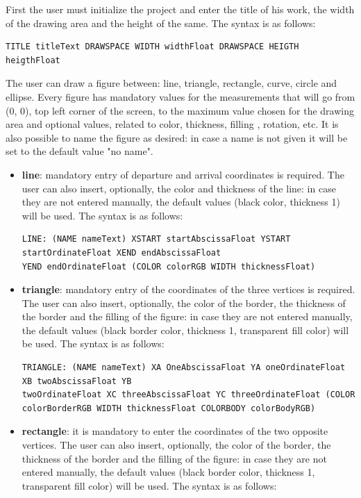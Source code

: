 \documentclass[a4paper]{article}
\begin{document}
First the user must initialize the project and enter the title of his work, the width of the drawing area and the height of the same. The syntax is as follows:
\begin{verbatim}
TITLE titleText DRAWSPACE WIDTH widthFloat DRAWSPACE HEIGTH heigthFloat
\end{verbatim}
The user can draw a figure between: line, triangle, rectangle, curve, circle and ellipse. Every figure has mandatory values for the measurements that will go from (0, 0), top left corner of the screen, to the maximum value chosen for the drawing area and optional values, related to color, thickness, filling , rotation, etc. It is also possible to name the figure as desired: in case a name is not given it will be set to the default value "no name".
\begin{itemize}
\item \textbf{line}: mandatory entry of departure and arrival coordinates is required. The user can also insert, optionally, the color and thickness of the line: in case they are not entered manually, the default values (black color, thickness 1) will be used. The syntax is as follows:
\begin{verbatim}
LINE: (NAME nameText) XSTART startAbscissaFloat YSTART startOrdinateFloat XEND endAbscissaFloat 
YEND endOrdinateFloat (COLOR colorRGB WIDTH thicknessFloat)
\end{verbatim}
\item \textbf{triangle}: mandatory entry of the coordinates of the three vertices is required. The user can also insert, optionally, the color of the border, the thickness of the border and the filling of the figure: in case they are not entered manually, the default values (black border color, thickness 1, transparent fill color) will be used. The syntax is as follows:
\begin{verbatim}
TRIANGLE: (NAME nameText) XA OneAbscissaFloat YA oneOrdinateFloat XB twoAbscissaFloat YB 
twoOrdinateFloat XC threeAbscissaFloat YC threeOrdinateFloat (COLOR
colorBorderRGB WIDTH thicknessFloat COLORBODY colorBodyRGB)
\end{verbatim}
\item \textbf{rectangle}: it is mandatory to enter the coordinates of the two opposite vertices. The user can also insert, optionally, the color of the border, the thickness of the border and the filling of the figure: in case they are not entered manually, the default values (black border color, thickness 1, transparent fill color) will be used. The syntax is as follows:

\end{itemize}
\end{document}
